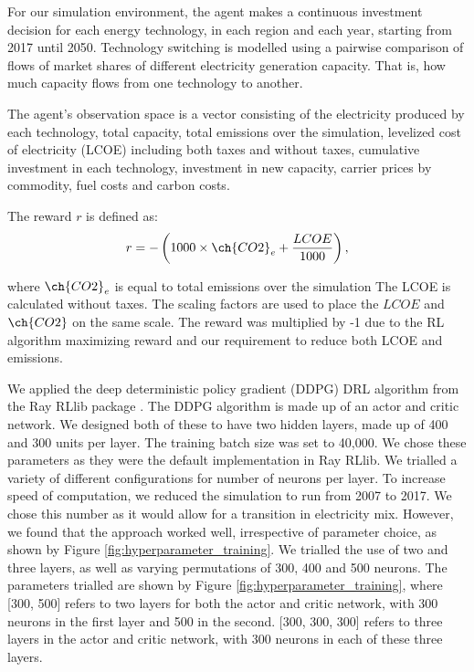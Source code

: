 For our simulation environment, the agent makes a continuous investment decision for each energy technology, in each region and each year, starting from 2017 until 2050. Technology switching is modelled using a pairwise comparison of flows of market shares of different electricity generation capacity. That is, how much capacity flows from one technology to another. 

The agent's observation space is a vector consisting of the electricity produced by each technology, total capacity, total  emissions over the simulation, levelized cost of electricity (LCOE) including both taxes and without taxes, cumulative investment in each technology, investment in new capacity, carrier prices by commodity, fuel costs and carbon costs.

The reward $r$ is defined as:
\begin{equation}
	\label{eq:reward_function}
	r = -\left(1000\times\ch{CO2}_e + \frac{LCOE}{1000}\right),
\end{equation}

where $\ch{CO2}_e$ is equal to total  emissions over the simulation The LCOE is calculated without taxes. The scaling factors are used to place the $LCOE$ and $\ch{CO2}$ on the same scale. The reward was multiplied by -1 due to the RL algorithm maximizing reward and our requirement to reduce both LCOE and  emissions.



We applied the deep deterministic policy gradient (DDPG) DRL algorithm \cite{Hunt2016a} from the Ray RLlib package \cite{Liang2014}. The DDPG algorithm is made up of an actor and critic network. We designed both of these to have two hidden layers, made up of 400 and 300 units per layer. The training batch size was set to 40,000. We chose these parameters as they were the default implementation in Ray RLlib. We trialled a variety of different configurations for number of neurons per layer. To increase speed of computation, we reduced the simulation to run from 2007 to 2017. We chose this number as it would allow for a transition in electricity mix. However, we found that the approach worked well, irrespective of parameter choice, as shown by Figure \ref{fig:hyperparameter_training}. We trialled the use of two and three layers, as well as varying permutations of 300, 400 and 500 neurons. The parameters trialled are shown by Figure \ref{fig:hyperparameter_training}, where [300, 500] refers to two layers for both the actor and critic network, with 300 neurons in the first layer and 500 in the second. [300, 300, 300] refers to three layers in the actor and critic network, with 300 neurons in each of these three layers.





